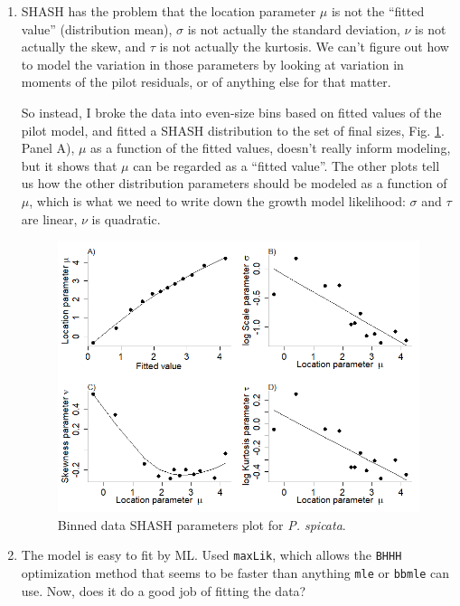 \documentclass[11pt]{article}
\begin{document}
{\begin{enumerate}
\item SHASH has the problem that the location parameter $\mu$ is not the ``fitted value'' (distribution mean), $\sigma$ is not actually
the standard deviation, $\nu$ is not actually the skew, and $\tau$ is not actually the kurtosis. We can't figure out how to model 
the variation in those parameters by looking at variation in moments of the pilot residuals, or of anything else for that matter. 

So instead, I broke the data into even-size bins based on fitted values of the pilot model, and fitted a SHASH distribution to
the set of final sizes, Fig. \ref{fig:rollingSHASHparsPSSP}. Panel A), $\mu$ as a function of the fitted values, doesn't really inform
modeling, but it shows that $\mu$ can be regarded as a ``fitted value''. The other plots tell us how the other distribution parameters
should be modeled as a function of $\mu$, which is what we need to write down the growth model likelihood: $\sigma$ and $\tau$ are linear,
$\nu$ is quadratic. 
 
\begin{figure}[tbp]
\centering
\includegraphics[width=.9\textwidth]{figures/RollingSHASHparsPSSP.png}
\caption{Binned data SHASH parameters plot for \emph{P. spicata}. }
\label{fig:rollingSHASHparsPSSP}
\end{figure} 

\item The model is easy to fit by ML. Used \texttt{maxLik}, which allows the \texttt{BHHH} optimization method that seems to be faster 
than anything \texttt{mle} or \texttt{bbmle} can use. Now, does it do a good job of fitting the data? 


\end{enumerate}}
\end{document}
